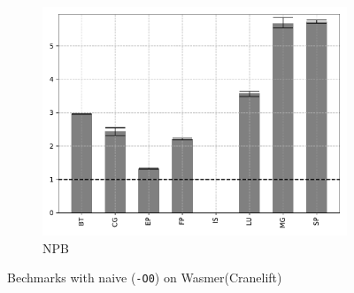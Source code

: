 \begin{figure}
\begin{subfigure}[t]{.45\textwidth}
        \includegraphics[width=\textwidth]
        {Images/6.1.RQ1/npb-wasmer-cranelift-naive.pdf}
        \caption{NPB}
    \end{subfigure}
    \caption{Bechmarks with naive (\texttt{-O0}) on Wasmer(Cranelift)}
    \label{fig:rq1-wasmer-cranelift-naive}
\end{figure}

